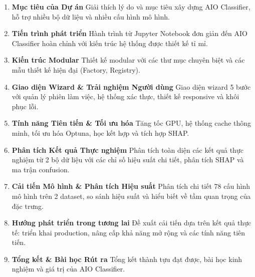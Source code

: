 \documentclass[a4paper,12pt]{article}
\begin{document}
\vspace{1em}
\begin{enumerate}
    \item \textbf{Mục tiêu của Dự án}  
    Giải thích lý do và mục tiêu xây dựng AIO Classifier, hỗ trợ nhiều bộ dữ liệu và nhiều cấu hình mô hình.

    \item \textbf{Tiến trình phát triển}  
    Hành trình từ Jupyter Notebook đơn giản đến AIO Classifier hoàn chỉnh với kiến trúc hệ thống được thiết kế tỉ mỉ.

    \item \textbf{Kiến trúc Modular}  
    Thiết kế modular với các thư mục chuyên biệt và các mẫu thiết kế hiện đại (Factory, Registry).

    \item \textbf{Giao diện Wizard \& Trải nghiệm Người dùng}  
    Giao diện wizard 5 bước với quản lý phiên làm việc, hệ thống xác thực, thiết kế responsive và khôi phục lỗi.

    \item \textbf{Tính năng Tiên tiến \& Tối ưu hóa}  
    Tăng tốc GPU, hệ thống cache thông minh, tối ưu hóa Optuna, học kết hợp và tích hợp SHAP.

    \item \textbf{Phân tích Kết quả Thực nghiệm}  
    Phân tích toàn diện các kết quả thực nghiệm từ 2 bộ dữ liệu với các chỉ số hiệu suất chi tiết, phân tích SHAP và ma trận confusion.

    \item \textbf{Cải tiến Mô hình \& Phân tích Hiệu suất}  
    Phân tích chi tiết 78 cấu hình mô hình trên 2 dataset, so sánh hiệu suất và hiểu biết về tầm quan trọng của đặc trưng.

    \item \textbf{Hướng phát triển trong tương lai}  
    Đề xuất cải tiến dựa trên kết quả thực tế: triển khai production, nâng cấp khả năng mở rộng và các tính năng tiên tiến.

    \item \textbf{Tổng kết \& Bài học Rút ra}  
    Tổng kết thành tựu đạt được, bài học kinh nghiệm và giá trị của AIO Classifier.
\end{enumerate}
\end{document}
